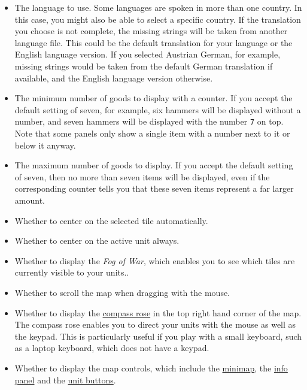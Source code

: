 \documentclass[12pt]{book}
\begin{document}
\begin{itemize}

\item The language to use. Some languages are spoken in
more than one country. In this case, you might also be able to select
a specific country. If the translation you choose is not complete, the
missing strings will be taken from another language file. This could
be the default translation for your language or the English language
version. If you selected Austrian German, for example, missing strings
would be taken from the default German translation if available, and
the English language version otherwise.

\item The minimum number of goods to display with a counter. If you
accept the default setting of seven, for example, six hammers will be
displayed without a number, and seven hammers will be displayed with
the number \verb$7$ on top. Note that some panels only show a single
item with a number next to it or below it anyway.

\item The maximum number of goods to display. If you accept the
default setting of seven, then no more than seven items will be
displayed, even if the corresponding counter tells you that these
seven items represent a far larger amount.

\item Whether to center on the selected tile automatically.

\item Whether to center on the active unit always.

\item Whether to display the \textit{Fog of War}, which enables you to
  see which tiles are currently visible to your units..

\item Whether to scroll the map when dragging with the mouse.

\item Whether to display the \hyperlink{compass rose}{compass rose} in
  the top right hand corner of the map. The compass rose enables you
  to direct your units with the mouse as well as the keypad. This is
  particularly useful if you play with a small keyboard, such as a
  laptop keyboard, which does not have a keypad.

\item Whether to display the map controls, which include the
  \hyperlink{minimap}{minimap}, the \hyperlink{info panel}{info panel}
  and the \hyperlink{unit buttons}{unit buttons}.


\end{itemize}
\end{document}

